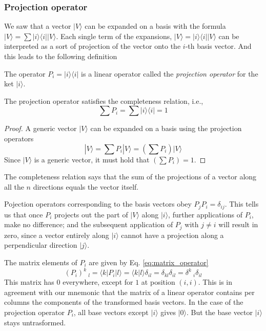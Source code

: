 \documentclass[11pt,fleqn]{book} %
\newcommand{\bra}[1]{\langle #1|}
\newcommand{\ket}[1]{| #1\rangle}
\newcommand{\scalar}[2]{\langle #1| #2\rangle}
\begin{document}
\subsubsection{Projection operator}
We saw that a vector $\ket{V}$ can be expanded on a basis with the formula $\ket{V}=\sum\ket{i}\bra{i}\ket{V}$.
Each single term of the expansions, $\ket{V}=\ket{i}\bra{i}\ket{V}$ can be interpreted as a sort of projection of the 
vector onto the $i$-th basis vector. And this leads to the following definition
\begin{definition}
    The operator $P_i = \ket{i}\bra{i}$ is a linear operator called the \textit{projection operator} for the ket $\ket{i}$.
\end{definition}
\begin{theorem}[Completeness]
    The projection operator satisfies the completeness relation, i.e., 
    \begin{equation}
        \label{eq:completness}
        \sum P_i =\sum\ket{i}\bra{i }= 1
    \end{equation}
\end{theorem}
\begin{proof}
    A generic vector $\ket{V}$ can be expanded on a basis using the projection operators
    \begin{equation*}
        \ket{V} = \sum P_i\ket{V} = \left(\sum P_i\right)\ket{V} 
    \end{equation*}
    Since $\ket{V}$ is a generic vector, it must hold that $\left(\sum P_i\right)=1$.
\end{proof}
\begin{remark}
    The completeness relation says that the sum of the projections of a vector along all the $n$
    directions equals the vector itself.
\end{remark}
\begin{remark}
    Pojection operators corresponding to the basis vectors obey $P_jP_i=\delta_{ij}$.
    This tells us that once $P_i$ projects out the part of $\ket{V}$ along $\ket{i}$, further applications of $P_i$, make
    no difference; and the subsequent application of $P_j$ with $j\neq i$ will result in zero, since a vector entirely
    along $\ket{i}$ cannot have a projection along a perpendicular direction $\ket{j}$.
\end{remark}

The matrix elements of $P_i$ are given by Eq. \ref{eq:matrix_operator}
\begin{equation*}
    \left(P_i\right)^k\:_l = \bra{k}P_i\ket{l} = \scalar{k}{l}\delta_{il} = \delta_{kl}\delta_{il} = \delta^k\:_i\delta_{il}
\end{equation*}
This matrix has $0$ everywhere, except for $1$ at position $(i,i)$. This is in agreement with our mnemonic that the matrix of a linear
operator contains per columns the components of the transformed basis vectors. In the case of the projection operator $P_i$, all base 
vectors except $\ket{i}$ gives $\ket{0}$. But the base vector $\ket{i}$  stays untrasformed.
\end{document}
